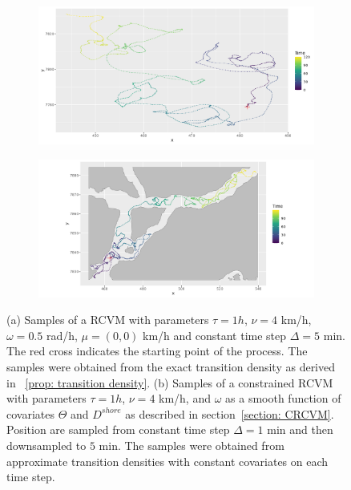 \documentclass[11pt]{article}
\newcommand {\1}{\mathbb{1}}
\theoremstyle{definition}
\theoremstyle{remark}
\theoremstyle{remark}
\begin{document}
\begin{figure}[H]
	\centering
	\begin{subfigure}{0.48\textwidth}
		\centering
		\includegraphics[scale=0.3]{images/rcvm/illustrative_sample_standard.png}
		\caption{}
	\end{subfigure}
	\begin{subfigure}{0.48\textwidth}
		\centering
		\includegraphics[scale=0.3]{images/crcvm/illustrative_sample_fjords_standard.png}
		\caption{}
	\end{subfigure}
	\caption{(a) Samples of a RCVM with parameters $\tau=1 h$, $\nu=4$ km/h,$\omega=0.5$ rad/h, $\mu=(0,0)$ km/h and constant time step $\Delta=5$ min. The red cross indicates the starting point of the process. The samples were obtained from the exact transition density as derived in ~\ref{prop: transition density}. (b) Samples of a constrained RCVM with parameters $\tau=1 h$, $\nu=4$ km/h, and $\omega$ as a smooth function of covariates $\Theta$ and $D^{shore}$ as described in section~\ref{section: CRCVM}. Position are sampled from constant time step $\Delta= 1$ min and then downsampled to $5$ min. The samples were obtained from approximate transition densities  with constant covariates on each time step.}
	\label{fig: sample RACVM}
\end{figure}
\end{document}

